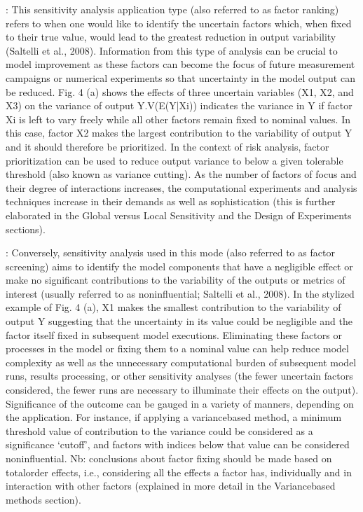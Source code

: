 \documentclass[letterpaper,10pt,english]{sphinxmanual}
\begin{document}
\sphinxAtStartPar
{}: This sensitivity analysis application type  (also referred to as factor ranking) refers to when one would like to identify the uncertain factors which, when fixed to their true value, would lead to the greatest reduction in output variability (Saltelli et al., 2008). Information from this type of analysis can be crucial to model improvement as these factors can become the focus of future measurement campaigns or numerical experiments so that uncertainty in the model output can be reduced. Fig. 4 (a) shows the effects of three uncertain variables (X1, X2, and X3) on the variance of output Y.V(E(Y|Xi)) indicates the variance in Y if factor Xi is left to vary freely while all other factors remain fixed to nominal values. In this case, factor X2 makes the largest contribution to the variability of output Y and it should therefore be prioritized. In the context of risk analysis, factor prioritization can be used to reduce output variance to below a given tolerable threshold (also known as variance cutting). As the number of factors of focus and their degree of interactions increases, the computational experiments and analysis techniques increase in their demands as well as sophistication (this is further elaborated in the Global versus Local Sensitivity and the Design of Experiments sections).

\sphinxAtStartPar
{}: Conversely, sensitivity analysis used in this mode (also referred to as factor screening) aims to identify the model components that have a negligible effect or make no significant contributions to the variability of the outputs or metrics of interest (usually referred to as non\sphinxhyphen{}influential; Saltelli et al., 2008). In the stylized example of Fig. 4 (a), X1 makes the smallest contribution to the variability of output Y suggesting that the uncertainty in its value could be negligible and the factor itself fixed in subsequent model executions. Eliminating these factors or processes in the model or fixing them to a nominal value can help reduce model complexity as well as the unnecessary computational burden of subsequent model runs, results processing, or other sensitivity analyses (the fewer uncertain factors considered, the fewer runs are necessary to illuminate their effects on the output). Significance of the outcome can be gauged in a variety of manners, depending on the application. For instance, if applying a variance\sphinxhyphen{}based method, a minimum threshold value of contribution to the variance could be considered as a significance ‘cutoff’, and factors with indices below that value can be considered non\sphinxhyphen{}influential. Nb: conclusions about factor fixing should be made based on total\sphinxhyphen{}order effects, i.e., considering all the effects a factor has, individually and in interaction with other factors (explained in more detail in the Variance\sphinxhyphen{}based methods section).
\end{document}
